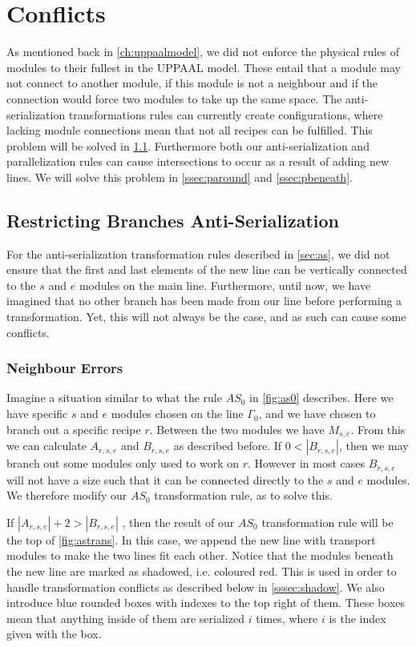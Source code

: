 \section{Conflicts}\label{ssec:conflicts}
As mentioned back in \cref{ch:uppaalmodel}, we did not enforce the physical rules of modules to their fullest in the UPPAAL model. These entail that a module may not connect to another module, if this module is not a neighbour and if the connection would force two modules to take up the same space. The anti-serialization transformations rules can currently create configurations, where lacking module connections mean that not all recipes can be fulfilled. This problem will be solved in \cref{ssec:restrictbranch}. Furthermore both our anti-serialization and parallelization rules can cause intersections to occur as a result of adding new lines. We will solve this problem in \cref{ssec:paround} and \cref{ssec:pbeneath}.


\subsection{Restricting Branches Anti-Serialization}\label{ssec:restrictbranch}
For the anti-serialization transformation rules described in \cref{sec:as}, we did not ensure that the first and last elements of the new line can be vertically connected to the $s$ and $e$ modules on the main line. Furthermore, until now, we have imagined that no other branch has been made from our line before performing a transformation. Yet, this will not always be the case, and as such can cause some conflicts.

\subsubsection{Neighbour Errors}
Imagine a situation similar to what the rule $AS_0$ in \cref{fig:as0} describes. Here we have specific $s$ and $e$ modules chosen on the line $\Gamma_0$, and we have chosen to branch out a specific recipe $r$. Between the two modules we have $M_{s,e}$. From this we can calculate $A_{r,s,e}$ and $B_{r,s,e}$ as described before. If $0 < |B_{r,s,e}|$, then we may branch out some modules only used to work on $r$. However in  most cases $B_{r,s,e}$ will not have a size such that it can be connected directly to the $s$ and $e$ modules. We therefore modify our $AS_0$ transformation rule, as to solve this.

If $|A_{r,s,e}| + 2 > |B_{r,s,e}|$ , then the result of our $AS_0$ transformation rule will be the top of \cref{fig:astrans}. In this case, we append the new line with transport modules to make the two lines fit each other. Notice that the modules beneath the new line are marked as shadowed, i.e. coloured red. This is used in order to handle transformation conflicts as described below in \cref{sssec:shadow}. We also introduce blue rounded boxes with indexes to the top right of them. These boxes mean that anything inside of them are serialized $i$ times, where $i$ is the index given with the box. 


